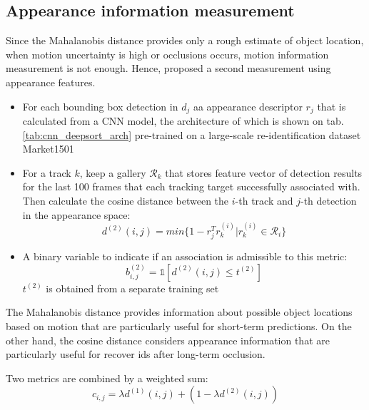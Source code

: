 \subsection{Appearance information measurement}
\hspace{0.5cm} Since the Mahalanobis distance provides only a rough estimate of object location, when motion uncertainty is high or occlusions occurs, motion information measurement is not enough. Hence, \cite{Wojke2017simple} proposed a second measurement using appearance features.\par
\begin{itemize}
    \item For each bounding box detection in $d_j$ aa appearance descriptor $r_j$ that is calculated from a  CNN model, 
    the architecture of which is shown on tab.\ref{tab:cnn_deepsort_arch} pre-trained on a large-scale re-identification dataset Market1501
    
    \item For a track $k$, keep a gallery $\mathcal{R}_k$ that stores feature vector of detection results for the last 100 frames that each tracking target successfully associated with.
     Then calculate the cosine distance between the $i$-th track and $j$-th detection in the appearance space:
    \begin{equation}
        d^{(2)}(i,j) = min\{1 - r_j^Tr^{(i)}_k | r^{(i)}_k\in \mathcal{R}_i\}
    \end{equation}
    \item A binary variable to indicate if an association is admissible to this metric:
    \begin{equation}
        b^{(2)}_{i,j}=\mathbb{1}[d^{(2)}(i,j) \leq t^{(2)}]
    \end{equation}
    $t^{(2)}$ is obtained from a separate training set
\end{itemize}
\hspace{0.5cm}The Mahalanobis distance provides information about possible object locations based on motion that are particularly useful for short-term predictions. On the other hand, the cosine distance considers appearance information that are particularly useful for recover ids after long-term occlusion.\par
Two metrics are combined by a weighted sum:
\begin{equation}
    c_{i,j} = \lambda d^{(1)}(i,j) + (1-\lambda d^{(2)}(i,j))
\end{equation}

